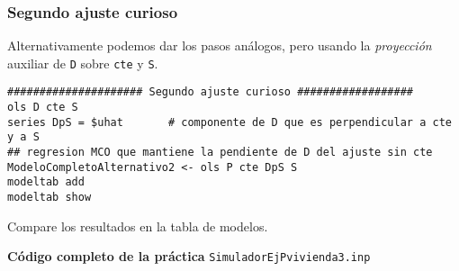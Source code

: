 \documentclass[11pt]{article}
\begin{document}
\subsubsection{Segundo ajuste curioso}
\label{sec:orgb5f934e}
Alternativamente podemos dar los pasos análogos, pero usando la
\emph{proyección} auxiliar de \texttt{D} sobre \texttt{cte} y \texttt{S}.
\begin{verbatim}
##################### Segundo ajuste curioso ##################
ols D cte S
series DpS = $uhat       # componente de D que es perpendicular a cte y a S
## regresion MCO que mantiene la pendiente de D del ajuste sin cte
ModeloCompletoAlternativo2 <- ols P cte DpS S 
modeltab add  
modeltab show
\end{verbatim}

Compare los resultados en la tabla de modelos.

\clearpage
\noindent
\textbf{Código completo de la práctica} \texttt{SimuladorEjPvivienda3.inp}


\clearpage
\end{document}
